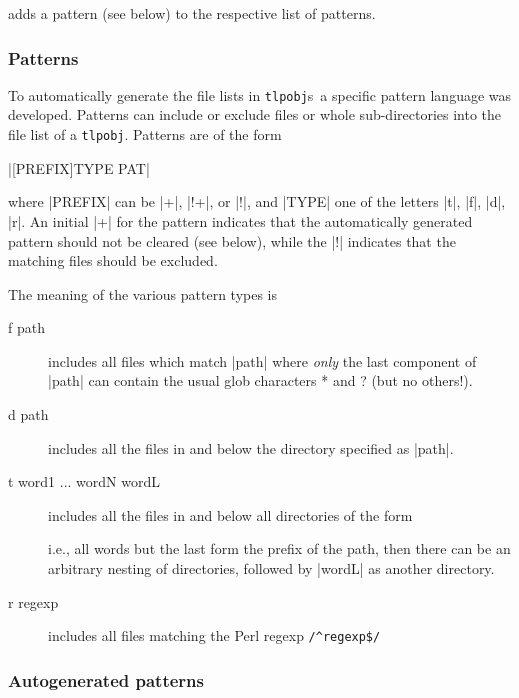 \documentclass{arstexnica}
\newcommand{\tlpobj}{\texttt{tlpobj}}
\newcommand{\tlpobjs}{\tlpobj{}s}
\begin{document}
\begin{article}
\begin{description}
{
\UndefineShortVerb{\|}
\item[(src|run|doc|bin)pattern pattern]
  adds a pattern (see below) to the respective list of patterns.
}

\end{description}

\subsubsection{Patterns}
\label{sec:patterns}

To automatically generate the file lists in \tlpobjs\ a specific
pattern language was developed. Patterns can include or exclude files
or whole sub-directories into the file list of a \tlpobj. Patterns are
of the form
\begin{center}
  |[PREFIX]TYPE PAT|
\end{center}
where |PREFIX| can be |+|, |!+|, or |!|, and |TYPE| one of the letters
|t|, |f|, |d|, |r|. An initial |+| for the pattern indicates that the
automatically generated pattern should not be cleared (see below),
while the |!| indicates that the matching files should be excluded.

The meaning of the various pattern types is
\begin{description}
\item[f path]
  includes all files which match |path| where \emph{only} the last
  component of |path| can contain the usual glob characters * and ?
  (but no others!).
\item[d path]
  includes all the files in and below the directory specified as
  |path|. 
\item[t word1 ... wordN wordL]
  includes all the files in and below all directories of the form
  \begin{center}
  \end{center}
  i.e., all words but the last form the prefix of the path, then
  there can be an arbitrary nesting of directories, followed by
  |wordL| as another directory.
\item[r regexp]
  includes all files matching the Perl regexp \verb+/^regexp$/+
\end{description}


\subsubsection{Autogenerated patterns}
\label{sec:autogenpat}


\end{article}
\end{document}
